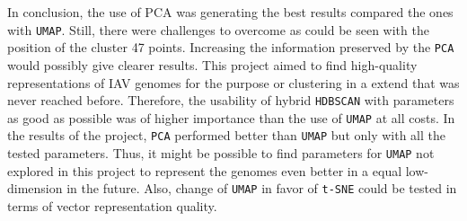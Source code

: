 \vspace{1em}

In conclusion, the use of PCA was generating the best results compared the ones with \texttt{UMAP}. Still, there were challenges to overcome as could be seen with the position of the cluster 47 points. Increasing the information preserved by the \texttt{PCA} would possibly give clearer results. This project aimed to find high-quality representations of \gls{IAV} genomes for the purpose or clustering in a extend that was never reached before. Therefore, the usability of hybrid \texttt{HDBSCAN} with parameters as good as possible was of higher importance than the use of \texttt{UMAP} at all costs. In the results of the project, \texttt{PCA} performed better than \texttt{UMAP} but only with all the tested parameters. Thus, it might be possible to find parameters for \texttt{UMAP} not explored in this project to represent the genomes even better in a equal low-dimension in the future. Also, change of \texttt{UMAP} in favor of \texttt{t-SNE} could be tested in terms of vector representation quality.